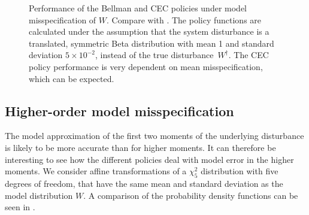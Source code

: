 \documentclass[main.tex]{subfiles}
\begin{document}
\begin{figure}[p]
\begin{subfigure}[b]{0.5\textwidth}
\begin{tikzpicture}[scale=0.95]
    \end{tikzpicture}
  \end{subfigure}
  \caption{Performance of the Bellman and CEC policies under model
    misspecification of
    $W$. Compare with .
    The policy functions are calculated under the assumption that
    the system disturbance is a translated, symmetric Beta
    distribution with mean 1
    and standard deviation $5\times 10^{-2}$, instead
    of the true disturbance~$W^\dagger$.
    The CEC policy performance is very dependent on mean misspecification,
    which can be expected.
  }\label{fig:markdown_bellman_cec_model_misspecification}
\end{figure}

\subsection{Higher-order model misspecification}
The model approximation of the first two moments of the underlying
disturbance is likely to be more accurate than for higher moments.
It can therefore be interesting to see how the different
policies deal with model error in the higher moments.
We consider affine transformations of a $\chi^2_5$ distribution with five degrees of
freedom, that have the same mean and standard deviation as the model
distribution $W$. A comparison of the probability density
functions can be seen in .
\end{document}
